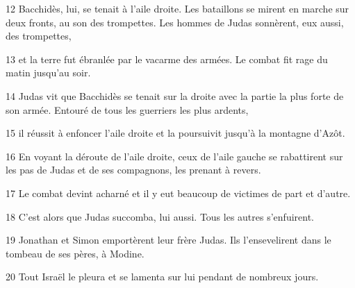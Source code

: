 
12 Bacchidès, lui, se tenait à l’aile droite. Les bataillons se mirent en marche sur deux fronts, au son des trompettes. Les hommes de Judas sonnèrent, eux aussi, des trompettes,

13 et la terre fut ébranlée par le vacarme des armées. Le combat fit rage du matin jusqu’au soir.

14 Judas vit que Bacchidès se tenait sur la droite avec la partie la plus forte de son armée. Entouré de tous les guerriers les plus ardents,

15 il réussit à enfoncer l’aile droite et la poursuivit jusqu’à la montagne d’Azôt.

16 En voyant la déroute de l’aile droite, ceux de l’aile gauche se rabattirent sur les pas de Judas et de ses compagnons, les prenant à revers.

17 Le combat devint acharné et il y eut beaucoup de victimes de part et d’autre.

18 C’est alors que Judas succomba, lui aussi. Tous les autres s’enfuirent.

19 Jonathan et Simon emportèrent leur frère Judas. Ils l’ensevelirent dans le tombeau de ses pères, à Modine.

20 Tout Israël le pleura et se lamenta sur lui pendant de nombreux jours.